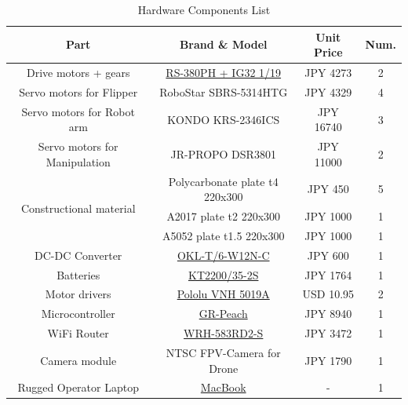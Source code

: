 \documentclass[journal]{IEEEtran}
\begin{document}
\begin{table}
\renewcommand{\arraystretch}{1}
 \tabcolsep=0.1cm
\caption{Hardware Components List} \label{tbl:hardware_list}
\centering
\begin{tabular}{|c|c|c|c|}
\hline
Part & Brand \& Model & Unit Price & Num. \\ \hline
Drive motors + gears & \href{http://store.shopping.yahoo.co.jp/suzakulab/rs-380phgm019.html}{RS-380PH + IG32 1/19} & JPY 4273 & 2 \\ 
Servo motors for Flipper & RoboStar SBRS-5314HTG & JPY 4329 & 4 \\
Servo motors for Robot arm & KONDO KRS-2346ICS & JPY 16740 & 3 \\
Servo motors for Manipulation & JR-PROPO DSR3801 & JPY 11000 & 2 \\ \hline
\multirow{3}{*}{Constructional material} & Polycarbonate plate t4 220x300 & JPY 450 & 5 \\
& A2017 plate t2 220x300 & JPY 1000 & 1 \\
& A5052 plate t1.5 220x300 & JPY 1000 & 1 \\ \hline
DC-DC Converter & \href{http://power.murata.com/en/okl-t-6-w12n-c.html}{OKL-T/6-W12N-C} & JPY 600 & 1 \\
Batteries & \href{http://www.kypom.com/pro_detail.asp?id=763}{KT2200/35-2S} & JPY 1764 & 1 \\
Motor drivers & \href{https://www.pololu.com/product/1449}{Pololu VNH 5019A} & USD 10.95 & 2 \\
Microcontroller & \href{https://developer.mbed.org/platforms/Renesas-GR-PEACH/}{GR-Peach} & JPY 8940 & 1 \\
WiFi Router & \href{http://www2.elecom.co.jp/products/WRH-583RD2-S.html}{WRH-583RD2-S} & JPY 3472 & 1 \\
Camera module & NTSC FPV-Camera for Drone & JPY 1790 & 1 \\ \hline
Rugged Operator Laptop & \href{http://www.apple.com}{MacBook} & - & 1 \\
\hline 
\end{tabular}
\end{table}
\end{document}
